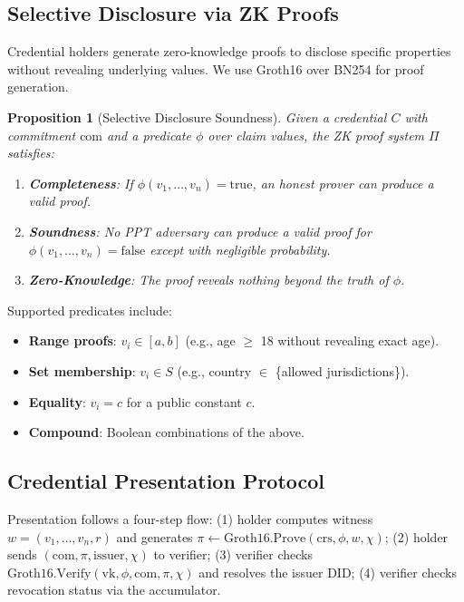 \documentclass[11pt,letterpaper]{article}
\newtheorem{proposition}[theorem]{Proposition}
\theoremstyle{definition}
\theoremstyle{remark}
\begin{document}
\subsection{Selective Disclosure via ZK Proofs}

Credential holders generate zero-knowledge proofs to disclose specific properties without revealing underlying values. We use Groth16 \cite{groth2016size} over BN254 for proof generation.

\begin{proposition}[Selective Disclosure Soundness]
Given a credential $C$ with commitment $\text{com}$ and a predicate $\phi$ over claim values, the ZK proof system $\Pi$ satisfies:
\begin{enumerate}
\item \textbf{Completeness}: If $\phi(v_1, \ldots, v_n) = \text{true}$, an honest prover can produce a valid proof.
\item \textbf{Soundness}: No PPT adversary can produce a valid proof for $\phi(v_1, \ldots, v_n) = \text{false}$ except with negligible probability.
\item \textbf{Zero-Knowledge}: The proof reveals nothing beyond the truth of $\phi$.
\end{enumerate}
\end{proposition}

Supported predicates include:

\begin{itemize}
\item \textbf{Range proofs}: $v_i \in [a, b]$ (e.g., age $\geq$ 18 without revealing exact age).
\item \textbf{Set membership}: $v_i \in S$ (e.g., country $\in$ \{allowed jurisdictions\}).
\item \textbf{Equality}: $v_i = c$ for a public constant $c$.
\item \textbf{Compound}: Boolean combinations of the above.
\end{itemize}

\subsection{Credential Presentation Protocol}

Presentation follows a four-step flow: (1) holder computes witness $w = (v_1, \ldots, v_n, r)$ and generates $\pi \leftarrow \text{Groth16.Prove}(\text{crs}, \phi, w, \chi)$; (2) holder sends $(\text{com}, \pi, \text{issuer}, \chi)$ to verifier; (3) verifier checks $\text{Groth16.Verify}(\text{vk}, \phi, \text{com}, \pi, \chi)$ and resolves the issuer DID; (4) verifier checks revocation status via the accumulator.
\end{document}
